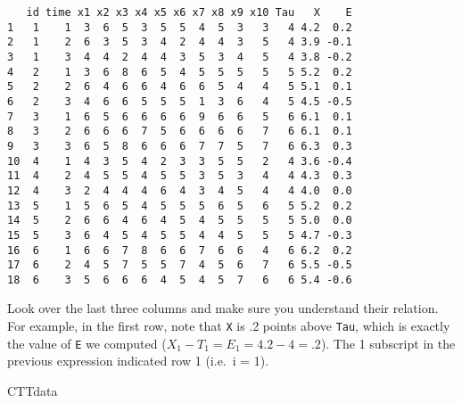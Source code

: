 \documentclass[
]{book}
\newenvironment{Shaded}{\begin{snugshade}}{\end{snugshade}}
\newcommand{\AttributeTok}[1]{\textcolor[rgb]{0.77,0.63,0.00}{#1}}
\newcommand{\DecValTok}[1]{\textcolor[rgb]{0.00,0.00,0.81}{#1}}
\newcommand{\FunctionTok}[1]{\textcolor[rgb]{0.00,0.00,0.00}{#1}}
\newcommand{\NormalTok}[1]{#1}
\newcommand{\OtherTok}[1]{\textcolor[rgb]{0.56,0.35,0.01}{#1}}
\newcommand{\SpecialCharTok}[1]{\textcolor[rgb]{0.00,0.00,0.00}{#1}}
\begin{document}
\begin{verbatim}
   id time x1 x2 x3 x4 x5 x6 x7 x8 x9 x10 Tau   X    E
1   1    1  3  6  5  3  5  5  4  5  3   3   4 4.2  0.2
2   1    2  6  3  5  3  4  2  4  4  3   5   4 3.9 -0.1
3   1    3  4  4  2  4  4  3  5  3  4   5   4 3.8 -0.2
4   2    1  3  6  8  6  5  4  5  5  5   5   5 5.2  0.2
5   2    2  6  4  6  6  4  6  6  5  4   4   5 5.1  0.1
6   2    3  4  6  6  5  5  5  1  3  6   4   5 4.5 -0.5
7   3    1  6  5  6  6  6  6  9  6  6   5   6 6.1  0.1
8   3    2  6  6  6  7  5  6  6  6  6   7   6 6.1  0.1
9   3    3  6  5  8  6  6  6  7  7  5   7   6 6.3  0.3
10  4    1  4  3  5  4  2  3  3  5  5   2   4 3.6 -0.4
11  4    2  4  5  5  4  5  5  3  5  3   4   4 4.3  0.3
12  4    3  2  4  4  4  6  4  3  4  5   4   4 4.0  0.0
13  5    1  5  6  5  4  5  5  5  6  5   6   5 5.2  0.2
14  5    2  6  6  4  6  4  5  4  5  5   5   5 5.0  0.0
15  5    3  6  4  5  4  5  5  4  4  5   5   5 4.7 -0.3
16  6    1  6  6  7  8  6  6  7  6  6   4   6 6.2  0.2
17  6    2  4  5  7  5  5  7  4  5  6   7   6 5.5 -0.5
18  6    3  5  6  6  6  4  5  4  5  7   6   6 5.4 -0.6
\end{verbatim}

Look over the last three columns and make sure you understand their relation.
For example, in the first row, note that \texttt{X} is .2 points above \texttt{Tau}, which is exactly the value of \texttt{E} we computed (\(X_1 - T_1 = E_1 = 4.2 - 4 = .2\)).
The 1 subscript in the previous expression indicated row 1 (i.e.~i = 1).

\begin{Shaded}
\end{Shaded}

\begin{Shaded}
\begin{Highlighting}[]
\NormalTok{CTTdata}
\end{Highlighting}
\end{Shaded}
\end{document}
